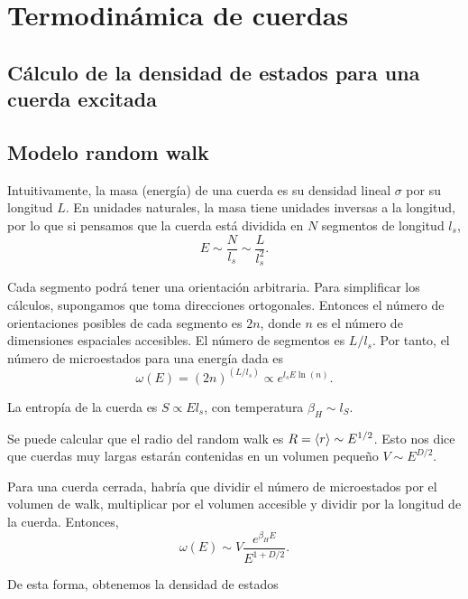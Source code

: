 \chapter{Termodinámica de cuerdas}

\section{Cálculo de la densidad de estados para una cuerda excitada}

\section{Modelo random walk}

Intuitivamente, la masa (energía) de una cuerda es su densidad lineal $\sigma$ por su longitud $L$.
En unidades naturales, la masa tiene unidades inversas a la longitud, por lo que si pensamos
que la cuerda está dividida en $N$ segmentos de longitud $l_s$, 
\begin{equation}
  E\sim  \frac{N}{l_s} \sim \frac{L}{l_s^2}.
\end{equation}

Cada segmento podrá tener una orientación arbitraria. Para simplificar los cálculos,
supongamos que toma direcciones ortogonales. Entonces el número de orientaciones posibles
de cada segmento es $2n$, donde $n$ es el número de dimensiones espaciales accesibles.
El número de segmentos es $L/l_s$.
Por tanto, el número de microestados para una energía dada es
\begin{equation}
  \omega(E)=(2n)^{(L/l_s)}\propto e^{l_s E \ln (n)}.
\end{equation}

La entropía de la cuerda es $S\propto El_s$, con temperatura $\beta_H\sim l_S$.

Se puede calcular que el radio del random walk es $R=\expval{r}\sim E^{1/2}$. Esto
nos dice que cuerdas muy largas estarán contenidas en un volumen pequeño $V\sim E^{D/2}$.

Para una cuerda cerrada, habría que dividir el número de microestados por el 
volumen de walk, multiplicar por el volumen accesible y dividir por la longitud de la cuerda.
Entonces,
\begin{equation}
  \omega(E)\sim V \frac{e^{\beta_H E}}{E^{1+D/2}}.
\end{equation}

De esta forma, obtenemos la densidad de estados 

